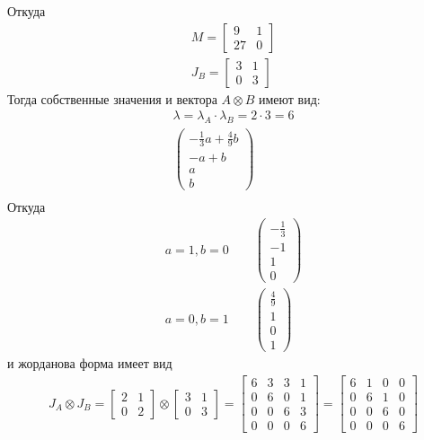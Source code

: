 Откуда 
\begin{gather*}
	M = 
	\begin{bmatrix}
		9 & 1 \\ 27 & 0
	\end{bmatrix}\\
	J_B = 
	\begin{bmatrix}
		3 & 1 \\ 0 & 3
	\end{bmatrix}
\end{gather*}
\vskip 0.2in
Тогда собственные значения и вектора $A \otimes B$ имеют вид:
\begin{gather*}
	\lambda = \lambda_A \cdot \lambda_B = 2 \cdot 3 = 6\\
	\begin{pmatrix}
	-\frac{1}{3}a + \frac{4}{9}b\\
	-a + b\\
	a\\
	b
	\end{pmatrix}\\
\end{gather*}
Откуда
\begin{gather*}
	a = 1, b = 0\qquad 
	\begin{pmatrix}
		-\frac{1}{3}\\ -1\\ 1\\ 0
	\end{pmatrix}
	\\
	a = 0, b = 1\qquad
	\begin{pmatrix}
		\frac{4}{9}\\ 1\\ 0\\ 1
	\end{pmatrix}
\end{gather*}
и жорданова форма имеет вид
\begin{gather*}
	J_A \otimes J_B = 
	\begin{bmatrix}
		2 & 1 \\ 0 & 2
	\end{bmatrix}
	\otimes
	\begin{bmatrix}
		3 & 1 \\ 0 & 3
	\end{bmatrix}
	=
	\begin{bmatrix}
		6 & 3 & 3 & 1\\
		0 & 6 & 0 & 1\\
		0 & 0 & 6 & 3\\
		0 & 0 & 0 & 6
	\end{bmatrix}
	=
	\begin{bmatrix}
		6 & 1 & 0 & 0\\
		0 & 6 & 1 & 0\\
		0 & 0 & 6 & 0\\
		0 & 0 & 0 & 6
	\end{bmatrix}
\end{gather*}


